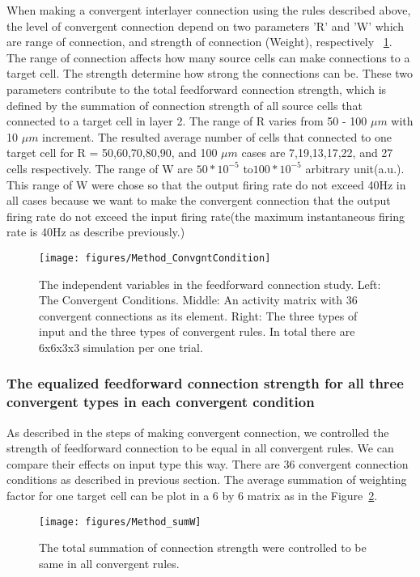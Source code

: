 When making a convergent interlayer connection using the rules described above, the level of convergent connection  depend on two parameters 'R' and 'W' which are range of connection, and strength of connection (Weight),  respectively ~\ref{fig:ConvergentConn}. The range of connection affects how many source cells can make connections to a target cell. The strength determine how strong the connections can be. These two parameters contribute to the total feedforward connection strength, which is defined by the summation of connection strength of all source cells that connected to a target cell in layer 2. The range of R varies from 50 - 100 $\mu m$ with 10 $\mu m$ increment. The resulted average number of cells that connected to one target cell for R = 50,60,70,80,90, and  100 $\mu m$ cases are 7,19,13,17,22, and 27 cells respectively. The range of W are $50*10^{-5} $ to$ 100*10^{-5}$  arbitrary unit(a.u.). This range of W were chose so that the output firing rate do not exceed 40Hz in all cases because we want to make the convergent connection that the output firing rate do not exceed the input firing rate(the maximum instantaneous firing rate is 40Hz as describe previously.) 
\begin{figure}[!h]
	\centering
	\texttt{[image: figures/Method\_ConvgntCondition]}
	\caption{The independent variables in the feedforward connection study. Left: The Convergent Conditions. Middle: An activity matrix with 36 convergent connections as its element. Right: The three types of input and the three types of convergent rules. In total there are 6x6x3x3 simulation per one trial.}
	\label{fig:ConvergentConn}
\end{figure} 



\subsubsection{The equalized feedforward connection strength for all three convergent types in each convergent condition}
As described in the steps of making convergent connection, we controlled the strength of feedforward connection to be equal in all convergent rules. We can compare their effects on input type this way.  There are 36 convergent connection conditions as described in previous section. The average summation of weighting factor for one target cell can be plot in a 6 by 6 matrix as in the Figure~\ref{fig:ConSumW}.
\begin{figure}
	\centering
	\texttt{[image: figures/Method\_sumW]}
	\caption{The total summation of connection strength were controlled to be same in all convergent rules.}
	\label{fig:ConSumW}
\end{figure}

